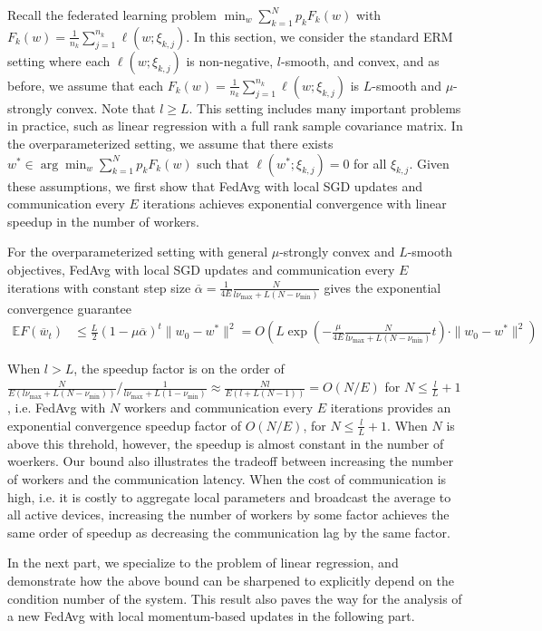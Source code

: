 Recall the federated learning problem $\min_{w}\sum_{k=1}^{N}p_{k}F_{k}(w)$
with $F_{k}(w)=\frac{1}{n_{k}}\sum_{j=1}^{n_{k}}\ell(w;\xi_{k,j})$.
In this section, we consider the standard ERM setting where each $\ell(w;\xi_{k,j})$
is non-negative, $l$-smooth, and convex, and as before, we assume
that each $F_{k}(w)=\frac{1}{n_{k}}\sum_{j=1}^{n_{k}}\ell(w;\xi_{k,j})$
is $L$-smooth and $\mu$-strongly convex. Note that $l\geq L$. This
setting includes many important problems in practice, such as linear
regression with a full rank sample covariance matrix. In the overparameterized
setting, we assume that there exists $w^{\ast}\in\arg\min_{w}\sum_{k=1}^{N}p_{k}F_{k}(w)$
such that $\ell(w^{\ast};\xi_{k,j})=0$ for all $\xi_{k,j}$. Given
these assumptions, we first show that FedAvg with local SGD updates
and communication every $E$ iterations achieves exponential convergence
with linear speedup in the number of workers.
\begin{theorem}
	For the overparameterized setting with general $\mu$-strongly convex
	and $L$-smooth objectives, FedAvg with local SGD updates and communication
	every $E$ iterations with constant step size $\overline{\alpha}=\frac{1}{4E}\frac{N}{l\nu_{\max}+L(N-\nu_{\min})}$
	gives the exponential convergence guarantee 
	\begin{align*}
	\mathbb{E}F(\overline{w}_{t}) & \leq\frac{L}{2}(1-\mu\overline{\alpha})^{t}\|w_{0}-w^{\ast}\|^{2}=O\left(L\exp\left(-\frac{\mu}{4E}\frac{N}{l\nu_{\max}+L(N-\nu_{\min})}t\right)\cdot\|w_{0}-w^{\ast}\|^{2}\right)
	\end{align*}
\end{theorem}
%
\begin{remark}
	When $l>L$, the speedup factor is on the order of $\frac{N}{E(l\nu_{\max}+L(N-\nu_{\min}))}/\frac{1}{l\nu_{\max}+L(1-\nu_{\min})}\approx\frac{Nl}{E(l+L(N-1))}=O(N/E)$
	for $N\leq\frac{l}{L}+1$, i.e. FedAvg with $N$ workers and communication
	every $E$ iterations provides an exponential convergence speedup
	factor of $O(N/E)$, for $N\leq\frac{l}{L}+1$. When $N$ is above
	this threhold, however, the speedup is almost constant in the number
	of woerkers. Our bound also illustrates the tradeoff between increasing
	the number of workers and the communication latency. When the cost
	of communication is high, i.e. it is costly to aggregate local parameters
	and broadcast the average to all active devices, increasing the number
	of workers by some factor achieves the same order of speedup as decreasing
	the communication lag by the same factor. 
\end{remark}
In the next part, we specialize to the problem of linear regression,
and demonstrate how the above bound can be sharpened to explicitly
depend on the condition number of the system. This result also paves
the way for the analysis of a new FedAvg with local momentum-based
updates in the following part. 

